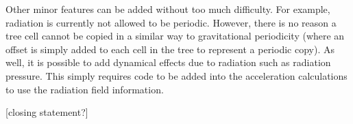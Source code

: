 Other minor features can be added without too much difficulty. For example, radiation is currently not allowed to be periodic. However, there is no reason a tree cell cannot be copied in a similar way to gravitational periodicity (where an offset is simply added to each cell in the tree to represent a periodic copy). As well, it is possible to add dynamical effects due to radiation such as radiation pressure. This simply requires code to be added into the acceleration calculations to use the radiation field information.

[closing statement?]